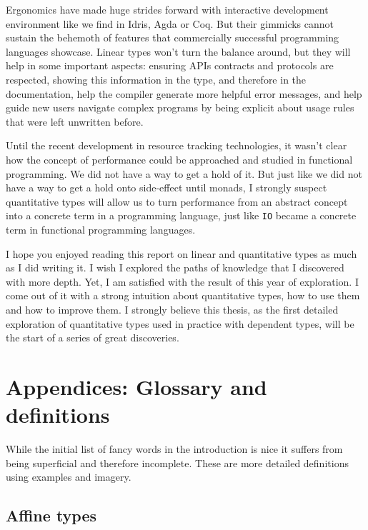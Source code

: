 \documentclass[
]{article}
\begin{document}
Ergonomics have made huge strides forward with interactive development
environment like we find in Idris, Agda or Coq. But their gimmicks
cannot sustain the behemoth of features that commercially successful
programming languages showcase. Linear types won't turn the balance
around, but they will help in some important aspects: ensuring APIs
contracts and protocols are respected, showing this information in the
type, and therefore in the documentation, help the compiler generate
more helpful error messages, and help guide new users navigate complex
programs by being explicit about usage rules that were left unwritten
before.

Until the recent development in resource tracking technologies, it
wasn't clear how the concept of performance could be approached and
studied in functional programming. We did not have a way to get a hold
of it. But just like we did not have a way to get a hold onto
side-effect until monads, I strongly suspect quantitative types will
allow us to turn performance from an abstract concept into a concrete
term in a programming language, just like \texttt{IO} became a concrete
term in functional programming languages.

I hope you enjoyed reading this report on linear and quantitative types
as much as I did writing it. I wish I explored the paths of knowledge
that I discovered with more depth. Yet, I am satisfied with the result
of this year of exploration. I come out of it with a strong intuition
about quantitative types, how to use them and how to improve them. I
strongly believe this thesis, as the first detailed exploration of
quantitative types used in practice with dependent types, will be the
start of a series of great discoveries.

\newpage

\hypertarget{appendices-glossary-and-definitions}{%
\section{Appendices: Glossary and
definitions}\label{appendices-glossary-and-definitions}}

While the initial list of fancy words in the introduction is nice it
suffers from being superficial and therefore incomplete. These are more
detailed definitions using examples and imagery.

\hypertarget{affine-types}{%
\subsection{Affine types}\label{affine-types}}
\end{document}
